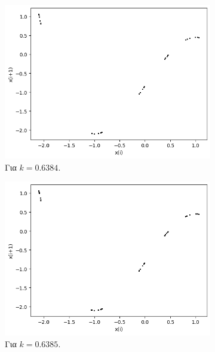 \begin{figure}[h!]
\begin{subfigure}[b]{0.4\textwidth}
		\includegraphics[width=\textwidth]{LateX images/graphs q21/g11}
		\caption{Για $k=0.6384$.}
		\label{f:k111}
	\end{subfigure}
	\hfill
	\begin{subfigure}[b]{0.4\textwidth}
		\centering
		\includegraphics[width=\textwidth]{LateX images/graphs q21/g12}
		\caption{Για $k=0.6385$.}
		\label{f:k112}
	\end{subfigure}
	\hfill
	\begin{subfigure}[b]{0.4\textwidth}
		\centering

\end{subfigure}
\end{figure}
